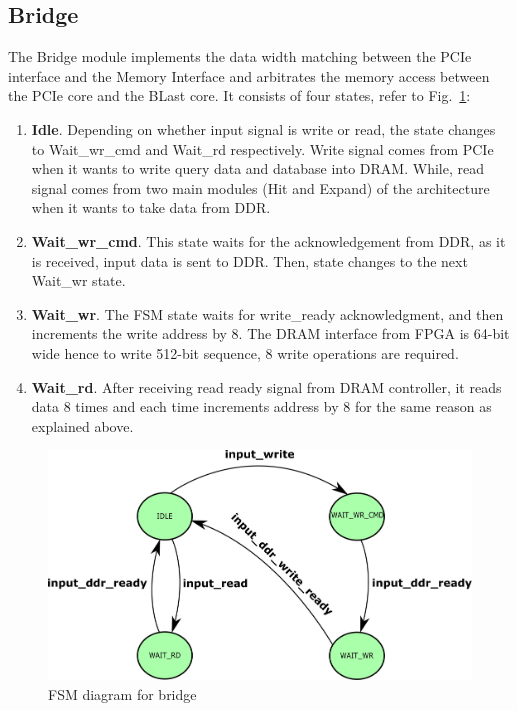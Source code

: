 \subsection{Bridge}
The Bridge module implements the data width matching between the PCIe interface and the Memory Interface and arbitrates the memory access between the PCIe core and the BLast core. 
It consists of four states, refer to Fig.~\ref{fig:bridge}:
\begin{enumerate}
\item \textbf{Idle}. Depending on whether input signal is write or read, the state changes to Wait\_wr\_cmd and Wait\_rd respectively. 
Write signal comes from PCIe when it wants to write query data and database into DRAM. 
While, read signal comes from two main modules (Hit and Expand) of the architecture when it wants to take data from DDR.
\item \textbf{Wait\_wr\_cmd}. This state waits for the acknowledgement from DDR, as it is received, input data is sent to DDR. Then, state changes to the next Wait\_wr state.
\item \textbf{Wait\_wr}. The FSM state waits for write\_ready acknowledgment, and then increments the write address by 8.
The DRAM interface from FPGA is 64-bit wide hence to write 512-bit sequence, 8 write operations are required. 
\item \textbf{Wait\_rd}. After receiving read ready signal from DRAM controller, it reads data 8 times and each time increments address by 8 for the same reason as explained above. 
\end{enumerate}


\begin{figure}
\centering
\includegraphics[width=\columnwidth]{Figures/bridgeFSM.pdf}
\caption{FSM diagram for bridge} \label{fig:bridge}
\end{figure}

